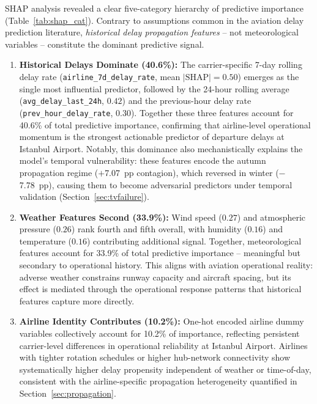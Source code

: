 \documentclass{report}
\begin{document}
SHAP analysis revealed a clear five-category hierarchy of predictive
importance (Table~\ref{tab:shap_cat}).  Contrary to assumptions common in the
aviation delay prediction literature, \emph{historical delay propagation
features} -- not meteorological variables -- constitute the dominant
predictive signal.

\begin{enumerate}

\item \textbf{Historical Delays Dominate (40.6\%):}
The carrier-specific 7-day rolling delay rate
(\texttt{airline\_7d\_delay\_rate}, mean $|\text{SHAP}| = 0.50$) emerges as
the single most influential predictor, followed by the 24-hour rolling average
(\texttt{avg\_delay\_last\_24h}, $0.42$) and the previous-hour delay rate
(\texttt{prev\_hour\_delay\_rate}, $0.30$).  Together these three features
account for 40.6\% of total predictive importance, confirming that
airline-level operational momentum is the strongest actionable predictor of
departure delays at Istanbul Airport.  Notably, this dominance also
mechanistically explains the model's temporal vulnerability: these features
encode the autumn propagation regime ($+$7.07~pp contagion), which reversed
in winter ($-$7.78~pp), causing them to become adversarial predictors under
temporal validation (Section~\ref{sec:tvfailure}).

\item \textbf{Weather Features Second (33.9\%):}
Wind speed ($0.27$) and atmospheric pressure ($0.26$) rank fourth and fifth
overall, with humidity ($0.16$) and temperature ($0.16$) contributing
additional signal.  Together, meteorological features account for 33.9\% of
total predictive importance -- meaningful but secondary to operational history.
This aligns with aviation operational reality: adverse weather constrains
runway capacity and aircraft spacing, but its effect is mediated through the
operational response patterns that historical features capture more directly.

\item \textbf{Airline Identity Contributes (10.2\%):}
One-hot encoded airline dummy variables collectively account for 10.2\% of
importance, reflecting persistent carrier-level differences in operational
reliability at Istanbul Airport.  Airlines with tighter rotation schedules or
higher hub-network connectivity show systematically higher delay propensity
independent of weather or time-of-day, consistent with the airline-specific
propagation heterogeneity quantified in Section~\ref{sec:propagation}.


\end{enumerate}
\end{document}
